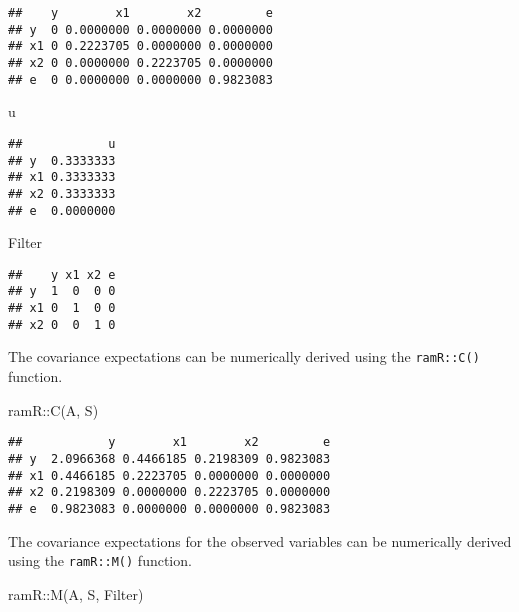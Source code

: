\documentclass[
]{book}
\newenvironment{Shaded}{\begin{snugshade}}{\end{snugshade}}
\newcommand{\FunctionTok}[1]{\textcolor[rgb]{0.00,0.00,0.00}{#1}}
\newcommand{\NormalTok}[1]{#1}
\newcommand{\SpecialCharTok}[1]{\textcolor[rgb]{0.00,0.00,0.00}{#1}}
\theoremstyle{definition}
\theoremstyle{definition}
\theoremstyle{definition}
\theoremstyle{remark}
\begin{document}
\begin{verbatim}
##    y        x1        x2         e
## y  0 0.0000000 0.0000000 0.0000000
## x1 0 0.2223705 0.0000000 0.0000000
## x2 0 0.0000000 0.2223705 0.0000000
## e  0 0.0000000 0.0000000 0.9823083
\end{verbatim}

\begin{Shaded}
\begin{Highlighting}[]
\NormalTok{u}
\end{Highlighting}
\end{Shaded}

\begin{verbatim}
##            u
## y  0.3333333
## x1 0.3333333
## x2 0.3333333
## e  0.0000000
\end{verbatim}

\begin{Shaded}
\begin{Highlighting}[]
\NormalTok{Filter}
\end{Highlighting}
\end{Shaded}

\begin{verbatim}
##    y x1 x2 e
## y  1  0  0 0
## x1 0  1  0 0
## x2 0  0  1 0
\end{verbatim}

The covariance expectations
can be numerically derived using the \texttt{ramR::C()} function.

\begin{Shaded}
\begin{Highlighting}[]
\NormalTok{ramR}\SpecialCharTok{::}\FunctionTok{C}\NormalTok{(A, S)}
\end{Highlighting}
\end{Shaded}

\begin{verbatim}
##            y        x1        x2         e
## y  2.0966368 0.4466185 0.2198309 0.9823083
## x1 0.4466185 0.2223705 0.0000000 0.0000000
## x2 0.2198309 0.0000000 0.2223705 0.0000000
## e  0.9823083 0.0000000 0.0000000 0.9823083
\end{verbatim}

The covariance expectations for the observed variables
can be numerically derived using the \texttt{ramR::M()} function.

\begin{Shaded}
\begin{Highlighting}[]
\NormalTok{ramR}\SpecialCharTok{::}\FunctionTok{M}\NormalTok{(A, S, Filter)}
\end{Highlighting}
\end{Shaded}
\end{document}
